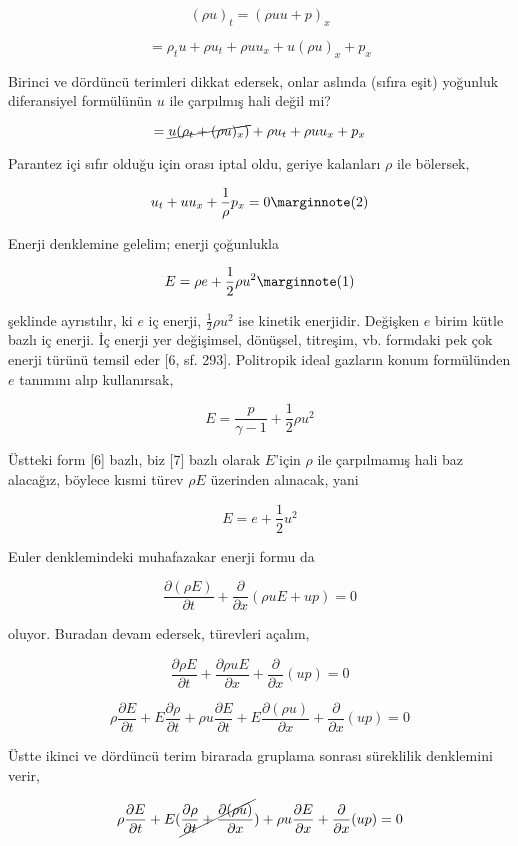 \documentclass[12pt,fleqn]{article}\usepackage{../../common}
\begin{document}
$$
(\rho u)_t = (\rho uu + p)_x
$$

$$
= \rho_t u + \rho u_t + \rho u u_x + u (\rho u)_x + p_x
$$

Birinci ve dördüncü terimleri dikkat edersek, onlar aslında (sıfıra eşit)
yoğunluk diferansiyel formülünün $u$ ile çarpılmış hali değil mi?

$$
= \cancel{u (\rho_t + (\rho u)_x )} + \rho u_t + \rho u u_x + p_x
$$

Parantez içi sıfır olduğu için orası iptal oldu, geriye kalanları $\rho$
ile bölersek,

$$
u_t + u u_x + \frac{1}{\rho} p_x = 0
\mlabel{2}
$$

Enerji
denklemine gelelim; enerji çoğunlukla

$$
E = \rho e + \frac{1}{2} \rho u^2
\mlabel{1}
$$

şeklinde ayrıstılır, ki $e$ iç enerji, $\frac{1}{2}\rho u^2$ ise kinetik
enerjidir. Değişken $e$ birim kütle bazlı iç enerji. İç enerji yer değişimsel,
dönüşsel, titreşim, vb. formdaki pek çok enerji türünü temsil eder [6, sf. 293].
Politropik ideal gazların konum formülünden $e$ tanımını alıp kullanırsak,

$$
E = \frac{p}{\gamma - 1} + \frac{1}{2} \rho u^2
$$

Üstteki form [6] bazlı, biz [7] bazlı olarak $E$'için $\rho$ ile çarpılmamış
hali baz alacağız, böylece kısmi türev $\rho E$ üzerinden alınacak, yani

$$
E = e + \frac{1}{2} u^2
$$

Euler denklemindeki muhafazakar enerji formu da

$$
\frac{\partial (\rho E)}{\partial t} + \frac{\partial }{\partial x} (\rho u E + up) = 0
$$

oluyor. Buradan devam edersek, türevleri açalım,

$$
\frac{\partial \rho E}{\partial t} + \frac{\partial \rho u E}{\partial x} +
\frac{\partial }{\partial x} (up) = 0
$$

$$
\rho \frac{\partial E}{\partial t} + E \frac{\partial \rho}{\partial t} +
\rho u \frac{\partial E}{\partial t} + E \frac{\partial (\rho u)}{\partial x} +
\frac{\partial }{\partial x} (up) = 0
$$

Üstte ikinci ve dördüncü terim birarada gruplama sonrası süreklilik denklemini
verir,

$$
\rho \frac{\partial E}{\partial t} +
E ( \cancel{\frac{\partial \rho}{\partial t} + \frac{\partial (\rho u)}{\partial x}}) +
\rho u \frac{\partial E}{\partial x} +
\frac{\partial }{\partial x} (up) = 0
$$
\end{document}

